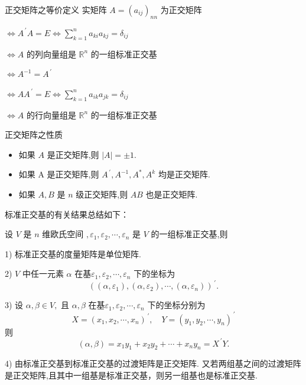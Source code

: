 \documentclass[13pt]{beamer}
\def\pf{{\bf 证明~~ }}
\def\Rn{\mathbb{R}^n}
\begin{document}
\begin{frame}{正交矩阵之等价定义}
\quad 实矩阵 $A=\left(a_{i j}\right)_{n n}$ 为正交矩阵 

 $\Leftrightarrow  {A}^{\, \prime} {A}={E}  \Leftrightarrow\sum_{k=1}^{n} a_{k i} a_{k j}=\delta_{i j} $
 
 $\Leftrightarrow A$ 的列向量组是 $\Rn$ 的一组标准正交基
 
 $\Leftrightarrow A^{-1}=A^{\, \prime}$
 
$\Leftrightarrow A A^{\, \prime}=E \Leftrightarrow \sum_{k=1}^{n} a_{i k} a_{j k}=\delta_{i j}$

$\Leftrightarrow A$ 的行向量组是 $\Rn$ 的一组标准正交基
\end{frame}


\begin{frame}{正交矩阵之性质}
\begin{itemize}
	\item 如果 $A$ 是正交矩阵,则 $|A|=\pm 1$.
	\item 如果 A 是正交矩阵,则 $A^{\, \prime}, A^{-1}, A^{*}, A^{k}$ 均是正交矩阵.
	\item 如果 $A, B$ 是 $n$ 级正交矩阵,则 $A B$ 也是正交矩阵.
\end{itemize}

\end{frame}

\begin{frame}
标准正交基的有关结果\alert{总结}如下：

设 $V$ 是 $n$ 维欧氏空间 $, \varepsilon_{1}, \varepsilon_{2}, \cdots, \varepsilon_{n}$ 是 $V$ 的一组标准正交基,则

1) 标准正交基的度量矩阵是单位矩阵.

2)  $V$ 中任一元素 $\alpha$ 在基$\varepsilon_{1}, \varepsilon_{2}, \cdots, \varepsilon_{n}$ 下的坐标为
\[
\left(\left(\alpha, \varepsilon_{1}\right),\left(\alpha, \varepsilon_{2}\right), \cdots,\left(\alpha, \varepsilon_{n}\right)\right)^{\, \prime}.
\]

3) 设 $\alpha, \beta \in V,$ 且 $\alpha, \beta$ 在基$\varepsilon_1, \varepsilon_{2}, \cdots, \varepsilon_{n}$ 下的坐标分别为
\[
X=\left(x_{1}, x_{2}, \cdots, x_{n}\right)^{\, \prime}, \quad Y=\left(y_{1}, y_{2}, \cdots, y_{n}\right)^{\, \prime}
\]
则
\[
(\alpha, \beta)=x_{1} y_{1}+x_{2} y_{2}+\cdots+x_{n} y_{n}=X^{\, \prime} Y.
\]

4) 由标准正交基到标准正交基的过渡矩阵是正交矩阵.
又若两组基之间的过渡矩阵是正交矩阵,且其中一组基是标准正交基，则另一组基也是标准正交基.
\end{frame}
\end{document}

